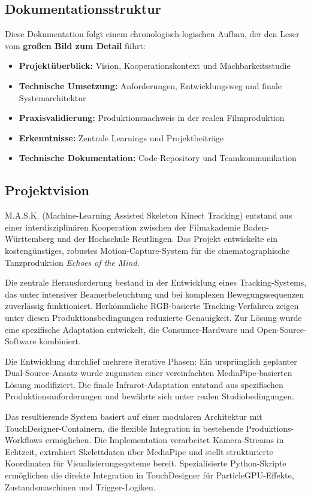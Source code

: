 \subsection*{Dokumentationsstruktur}

Diese Dokumentation folgt einem chronologisch-logischen Aufbau, der den Leser vom \textbf{großen Bild zum Detail} führt:

\begin{itemize}
    \item \textbf{Projektüberblick:} Vision, Kooperationskontext und Machbarkeitsstudie
    \item \textbf{Technische Umsetzung:} Anforderungen, Entwicklungsweg und finale Systemarchitektur  
    \item \textbf{Praxisvalidierung:} Produktionsnachweis in der realen Filmproduktion
    \item \textbf{Erkenntnisse:} Zentrale Learnings und Projektbeiträge
    \item \textbf{Technische Dokumentation:} Code-Repository und Teamkommunikation
\end{itemize}

\subsection*{Projektvision}

M.A.S.K. (Machine-Learning Assisted Skeleton Kinect Tracking) entstand aus einer interdisziplinären Kooperation zwischen der Filmakademie Baden-Württemberg und der Hochschule Reutlingen. Das Projekt entwickelte ein kostengünstiges, robustes Motion-Capture-System für die cinematographische Tanzproduktion \textit{Echoes of the Mind}.

Die zentrale Herausforderung bestand in der Entwicklung eines Tracking-Systems, das unter intensiver Beamerbeleuchtung und bei komplexen Bewegungssequenzen zuverlässig funktioniert. Herkömmliche RGB-basierte Tracking-Verfahren zeigen unter diesen Produktionsbedingungen reduzierte Genauigkeit. Zur Lösung wurde eine spezifische Adaptation entwickelt, die Consumer-Hardware und Open-Source-Software kombiniert.

Die Entwicklung durchlief mehrere iterative Phasen: Ein ursprünglich geplanter Dual-Source-Ansatz wurde zugunsten einer vereinfachten MediaPipe-basierten Lösung modifiziert. Die finale Infrarot-Adaptation entstand aus spezifischen Produktionsanforderungen und bewährte sich unter realen Studiobedingungen.

Das resultierende System basiert auf einer modularen Architektur mit TouchDesigner-Containern, die flexible Integration in bestehende Produktions-Workflows ermöglichen. Die Implementation verarbeitet Kamera-Streams in Echtzeit, extrahiert Skelettdaten über MediaPipe und stellt strukturierte Koordinaten für Visualisierungssysteme bereit. Spezialisierte Python-Skripte ermöglichen die direkte Integration in TouchDesigner für ParticleGPU-Effekte, Zustandsmaschinen und Trigger-Logiken.

